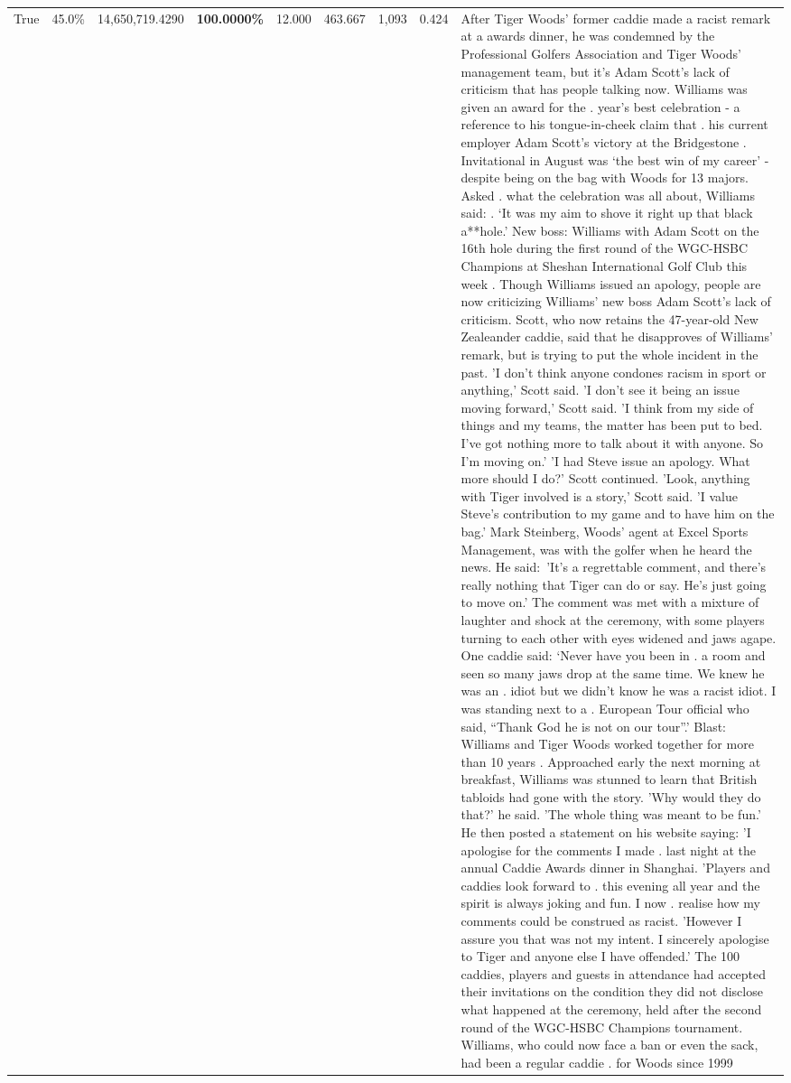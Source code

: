 \begin{table}[H]
\begin{tabular}{lllrlllll}
True & 45.0\% & 14,650,719.4290 & \bfseries \color{red} 100.0000\% & 12.000 & 463.667 & 1,093 & 0.424 & After Tiger Woods' former caddie made a racist remark at a awards dinner, he was condemned by the Professional Golfers Association and Tiger Woods' management team, but it's Adam Scott's lack of criticism that has people talking now. Williams was given an award for the . year’s best celebration - a reference to his tongue-in-cheek claim that . his current employer Adam Scott’s victory at the Bridgestone . Invitational in August was ‘the best win of my career’ - despite being on the bag with Woods for 13 majors. Asked . what the celebration was all about, Williams said: . ‘It was my aim to shove it right up that black a**hole.’ New boss: Williams with Adam Scott  on the 16th hole during the first round of the WGC-HSBC Champions at Sheshan International Golf Club this week . Though Williams issued an apology, people are now criticizing Williams' new boss Adam Scott's lack of criticism. Scott, who now retains the 47-year-old New Zealeander caddie, said that he disapproves of Williams' remark, but is trying to put the whole incident in the past. 'I don't think anyone condones racism in sport or anything,' Scott said. 'I don't see it being an issue moving forward,' Scott said. 'I think from my side of things and my teams, the matter has been put to bed. I've got nothing more to talk about it with anyone. So I'm moving on.' 'I had Steve issue an apology. What more should I do?' Scott continued. 'Look, anything with Tiger involved is a story,' Scott said. 'I value Steve's contribution to my game and to have him on the bag.' Mark Steinberg, Woods' agent at Excel Sports Management, was with the golfer when he heard the news. He said: 'It's a regrettable comment, and there's really nothing that Tiger can do or say. He's just going to move on.' The comment was met with a mixture of laughter and shock at the ceremony, with some players turning to each other with eyes widened and jaws agape. One caddie said: ‘Never have you been in . a room and seen so many jaws drop at the same time. We knew he was an . idiot but we didn’t know he was a racist idiot. I was standing next to a . European Tour official who said, “Thank God he is not on our tour”.’ Blast: Williams and Tiger Woods worked together for more than 10 years . Approached early the next morning at breakfast, Williams was stunned to learn that British tabloids had gone with the story. 'Why would they do that?' he said. 'The whole thing was meant to be fun.' He then posted a statement on his website saying: 'I apologise for the comments I made . last night at the annual Caddie Awards dinner in Shanghai. 'Players and caddies look forward to . this evening all year and the spirit is always joking and fun. I now . realise how my comments could be construed as racist. 'However I assure you that was not my intent. I sincerely apologise to Tiger and anyone else I have offended.' The 100 caddies, players and guests in attendance had accepted their invitations on the condition they did not disclose what happened at the ceremony, held after the second round of the WGC-HSBC Champions tournament. Williams, who could now face a ban or even the sack, had been a regular caddie . for Woods since 1999 
\end{tabular}
\end{table}
